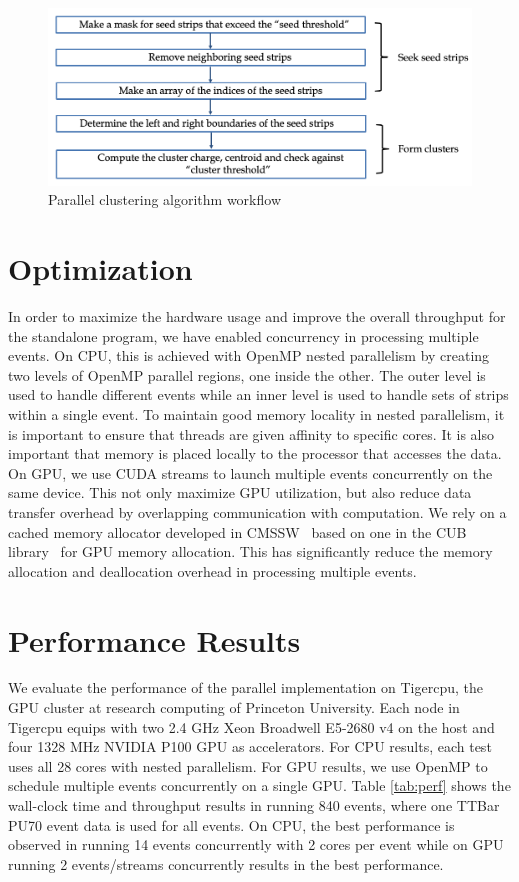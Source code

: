 \documentclass[10pt, paper=a4, UKenglish]{article}
\begin{document}
\begin{figure}[!htb]
  \centering
  \includegraphics[scale=0.4]{workflow}
  \caption{Parallel clustering algorithm workflow}
  \label{fig:workflow}
\end{figure}


\section{Optimization}
\label{opt}
In order to maximize the hardware usage and improve the overall throughput for the standalone program, we have enabled concurrency in processing multiple events. On CPU, this is achieved with OpenMP nested parallelism by creating two levels of OpenMP parallel regions, one inside the other. The outer level is used to handle different events while an inner level is used to handle sets of strips within a single event. To maintain good memory locality in nested parallelism, it is important to ensure that threads are given affinity to specific cores. It is also important that memory is placed locally to the processor that accesses the data. On GPU, we use CUDA streams to launch multiple events concurrently on the same device. This not only maximize GPU utilization, but also reduce data transfer overhead by overlapping communication with computation. We rely on a cached memory allocator developed in CMSSW~\cite{2020arXiv200404334B} based on one in the CUB library~\cite{cub} for GPU memory allocation. This has significantly reduce the memory allocation and deallocation overhead in processing multiple events. 

\section{Performance Results}
We evaluate the performance of the parallel implementation on Tigercpu, the GPU cluster at research computing of Princeton University. Each node in Tigercpu equips with two 2.4 GHz Xeon Broadwell E5-2680 v4 on the host and four 1328 MHz NVIDIA P100 GPU as accelerators. For CPU results, each test uses all 28 cores with nested parallelism. For GPU results, we use OpenMP to schedule multiple events concurrently on a single GPU. Table \ref{tab:perf} shows the wall-clock time and throughput results in running 840 events, where one TTBar PU70 event data is used for all events. On CPU, the best performance is observed in running 14 events concurrently with 2 cores per event while on GPU running 2 events/streams concurrently results in the best performance. 
\end{document}
